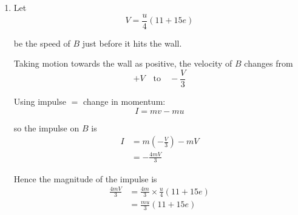 \documentclass[leqno]{article}
\begin{document}
\begin{enumerate}[
  label=\textbf{\arabic*.},
  leftmargin=*,
  topsep=0pt,
  partopsep=0pt,
  parsep=0pt
]
\begin{djsSolution}
\begin{enumerate}[label=\textbf{(\alph*)}]
  Their relative speed is
  \[
  v_A+\frac{v_B}{3}
  \]

  Hence the time until they meet is
  \begin{align*}
  \frac{d\left(1-\frac{v_A}{v_B}\right)}{v_A+\frac{v_B}{3}}
  \end{align*}

  Substitute for $v_A$ and $v_B$:
  \begin{align*}
  1-\frac{v_A}{v_B}
  &=\frac{v_B-v_A}{v_B}
  =\frac{5eu}{(11+15e)u/4}
  =\frac{20e}{11+15e}
  \end{align*}

  and
  \begin{align*}
  v_A+\frac{v_B}{3}
  &=\frac{u}{4}(11-5e)+\frac{1}{3}\times \frac{u}{4}(11+15e)\\
  &=\frac{u}{12}\bigl(3(11-5e)+(11+15e)\bigr)\\
  &=\frac{44u}{12}\\
  &=\frac{11u}{3}
  \end{align*}

  Therefore
  \begin{align*}
  \text{time to second collision}
  &=\frac{d\left(\frac{20e}{11+15e}\right)}{11u/3}\\
  &=\frac{60de}{11u(11+15e)}
  \end{align*}

  Since $d>0$, $u>0$ and $e>0$, this time is positive.

  Therefore there \emph{will} be a second collision between $A$ and $B$ after $B$ has collided with the wall.

  \item Let
  \[
  V=\frac{u}{4}(11+15e)
  \]

  be the speed of $B$ just before it hits the wall.

  Taking motion towards the wall as positive, the velocity of $B$ changes from
  \[
  +V \quad \text{to} \quad -\frac{V}{3}
  \]

  Using impulse \(=\) change in momentum:
  \[
  I=mv-mu
  \]

  so the impulse on $B$ is
  \begin{align*}
  I&=m\left(-\frac{V}{3}\right)-mV \\
  &=-\frac{4mV}{3}
  \end{align*}

  Hence the magnitude of the impulse is
  \begin{align*}
  \frac{4mV}{3}
  &=\frac{4m}{3}\times \frac{u}{4}(11+15e)\\
  &=\frac{mu}{3}(11+15e)
  \end{align*}



\end{enumerate}
\end{djsSolution}
\end{enumerate}
\end{document}
